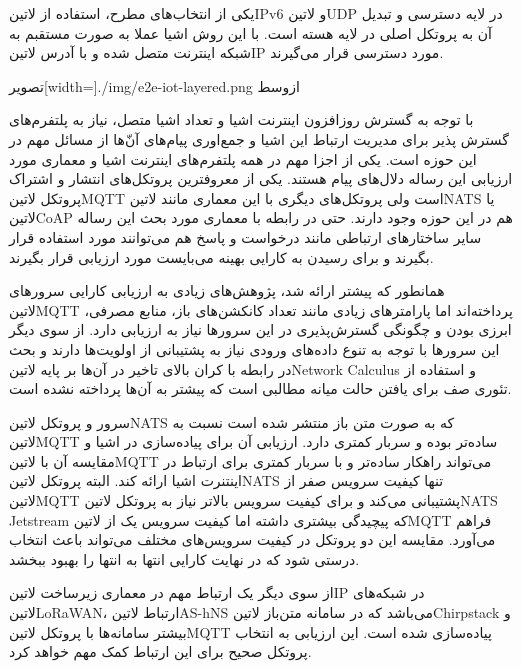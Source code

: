 یکی از انتخاب‌های مطرح، استفاده از ‌لاتین{IPv6} و ‌لاتین{UDP} در لایه دسترسی و تبدیل آن به پروتکل اصلی در لایه هسته است. با این روش
اشیا عملا به صورت مستقبم به شبکه اینترنت متصل شده و با آدرس ‌لاتین{IP} مورد دسترسی قرار می‌گیرند.

‌تصویر[width=\textwidth]{./img/e2e-iot-layered.png}
‌ازوسط


با توجه به گسترش روزافزون اینترنت اشیا و تعداد اشیا متصل، نیاز به پلتفرم‌های گسترش پذیر برای مدیریت ارتباط این اشیا و جمع‌اوری پیام‌های آن‌ّها
از مسائل مهم در این حوزه است. یکی از اجزا مهم در همه پلتفرم‌های اینترنت اشیا و معماری مورد ارزیابی این رساله دلال‌های پیام هستند. یکی از
معروفترین پروتکل‌های انتشار و اشتراک پروتکل ‌لاتین{MQTT} است ولی پروتکل‌های دیگری با این معماری مانند ‌لاتین{NATS} یا
‌لاتین{CoAP} هم در این حوزه وجود دارند. حتی در رابطه با معماری مورد بحث این رساله سایر ساختارهای ارتباطی مانند درخواست و پاسخ
هم می‌توانند مورد استفاده قرار بگیرند و برای رسیدن به کارایی بهینه می‌بایست مورد ارزیابی قرار بگیرند.

همانطور که پیشتر ارائه شد، پژوهش‌های زیادی به ارزیابی کارایی سرورهای ‌لاتین{MQTT} پرداخته‌اند اما پارامترهای زیادی مانند تعداد کانکشن‌های باز،
منابع مصرفی، ابرزی بودن و چگونگی گسترش‌پذیری در این سرورها نیاز به ارزیابی دارد. از سوی دیگر این سرورها با توجه به تنوع داده‌های ورودی نیاز به پشتیبانی
از اولویت‌ها دارند و بحث در رابطه با کران بالای تاخیر در آن‌ها بر پایه ‌لاتین{Network Calculus}
و استفاده از تئوری صف برای یافتن حالت میانه مطالبی است که پیشتر به آن‌ها پرداخته نشده است.

سرور و پروتکل ‌لاتین{NATS} که به صورت متن باز منتشر شده است نسبت به ‌لاتین{MQTT} ساده‌تر بوده و سربار کمتری دارد. ارزیابی آن
برای پیاده‌سازی در اشیا و مقایسه آن با ‌لاتین{MQTT} می‌تواند راهکار ساده‌تر و با سربار کمتری برای ارتباط در اینتنرت اشیا ارائه کند.
البته پروتکل ‌لاتین{NATS} تنها کیفیت سرویس صفر از ‌لاتین{MQTT} پشتیبانی می‌کند و برای کیفیت سرویس بالاتر نیاز به
پروتکل ‌لاتین{NATS Jetstream} که پیچیدگی بیشتری داشته اما کیفیت سرویس یک از ‌لاتین{MQTT} فراهم می‌آورد.
مقایسه این دو پروتکل در کیفیت سرویس‌های مختلف می‌تواند باعث انتخاب درستی شود که در نهایت کارایی انتها به انتها را بهبود ببخشد.

از سوی دیگر یک ارتباط مهم در معماری زیرساخت ‌لاتین{IP} در شبکه‌های ‌لاتین{LoRaWAN}،
ارتباط ‌لاتین{AS-hNS} می‌باشد که در سامانه متن‌باز ‌لاتین{Chirpstack} و بیشتر سامانه‌ها با پروتکل ‌لاتین{MQTT} پیاده‌سازی شده است.
این ارزیابی به انتخاب پروتکل صحیح برای این ارتباط کمک مهم خواهد کرد.

